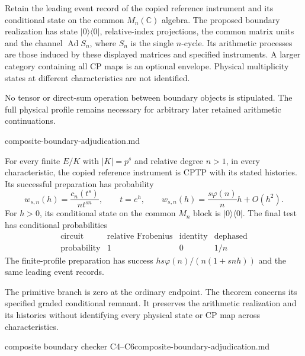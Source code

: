 \begin{definition}
Retain the leading event record of the copied reference instrument and
its conditional state on the common $M_n(\mathbb C)$ algebra. The proposed
boundary realization has state $|0\rangle\langle0|$, relative-index
projections, the common matrix units and the channel $\operatorname{Ad}S_n$,
where $S_n$ is the single $n$-cycle. Its arithmetic processes are those
induced by these displayed matrices and specified instruments. A larger
category containing all CP maps is an optional envelope. Physical
multiplicity states at different characteristics are not identified.
\end{definition}
\begin{scope}
No tensor or direct-sum operation between boundary objects is stipulated.
The full physical profile remains necessary for arbitrary later retained
arithmetic continuations.
\end{scope}
{composite-boundary-adjudication.md}

\begin{theorem}
\statusProved\quad
For every finite $E/K$ with $|K|=p^s$ and relative degree $n>1$, in every
characteristic, the copied reference instrument is CPTP with its stated
histories. Its successful preparation has probability
\[
 w_{s,n}(h)=\frac{c_n(t^s)}{n t^{sn}},\qquad t=e^h,
 \qquad w_{s,n}(h)=\frac{s\varphi(n)}n h+O(h^2).
\]
For $h>0$, its conditional state on the common $M_n$ block is
$|0\rangle\langle0|$. The final test has conditional probabilities
\[
 \begin{array}{c|ccc}
 \text{circuit}&\text{relative Frobenius}&\text{identity}&\text{dephased}\\\hline
 \text{probability}&1&0&1/n
 \end{array}
\]
The finite-profile preparation has success
$h s\varphi(n)/(n(1+snh))$ and the same leading event records.
\end{theorem}
\begin{scope}
The primitive branch is zero at the ordinary endpoint. The theorem
concerns its specified graded conditional remnant. It preserves the
arithmetic realization and its histories without identifying every
physical state or CP map across characteristics.
\end{scope}
{composite boundary checker C4--C6}{composite-boundary-adjudication.md}

